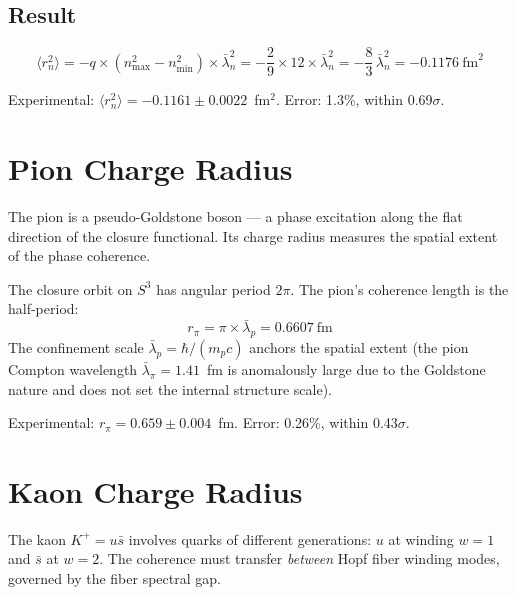 \documentclass[12pt]{article}
\newcommand{\lbar}{\bar{\lambda}}
\begin{document}
\subsection{Result}

\begin{equation}\label{eq:neutron}
    \langle r_n^2 \rangle = -q \times (n_{\max}^2 - n_{\min}^2) \times \lbar_n^2 = -\frac{2}{9} \times 12 \times \lbar_n^2 = -\frac{8}{3}\,\lbar_n^2 = -0.1176~\text{fm}^2
\end{equation}

\noindent Experimental: $\langle r_n^2 \rangle = -0.1161 \pm 0.0022$~fm$^2$. Error: 1.3\%, within 0.69$\sigma$.

\section{Pion Charge Radius}\label{sec:pion}

The pion is a pseudo-Goldstone boson --- a phase excitation along the flat direction of the closure functional. Its charge radius measures the spatial extent of the phase coherence.

The closure orbit on $S^3$ has angular period $2\pi$. The pion's coherence length is the half-period:
\begin{equation}\label{eq:pion}
    r_\pi = \pi \times \lbar_p = 0.6607~\text{fm}
\end{equation}
The confinement scale $\lbar_p = \hbar/(m_p c)$ anchors the spatial extent (the pion Compton wavelength $\lbar_\pi = 1.41$~fm is anomalously large due to the Goldstone nature and does not set the internal structure scale).

\noindent Experimental: $r_\pi = 0.659 \pm 0.004$~fm. Error: 0.26\%, within 0.43$\sigma$.

\section{Kaon Charge Radius}\label{sec:kaon}

The kaon $K^+ = u\bar{s}$ involves quarks of different generations: $u$ at winding $w = 1$ and $\bar{s}$ at $w = 2$. The coherence must transfer \textit{between} Hopf fiber winding modes, governed by the fiber spectral gap.
\end{document}
